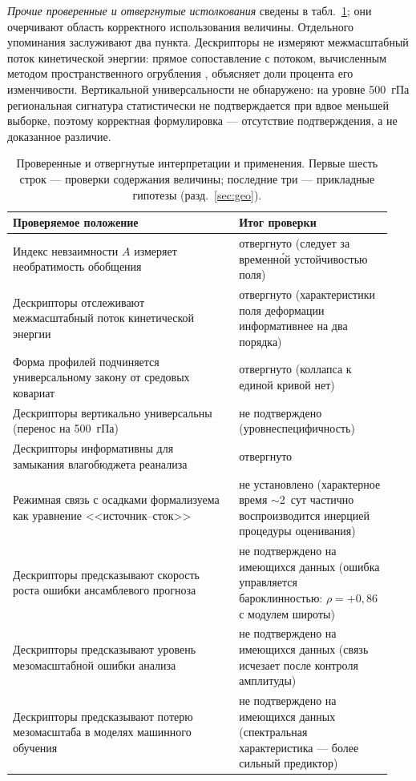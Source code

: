 \documentclass[11pt,a4paper]{article}
\begin{document}
\emph{Прочие проверенные и отвергнутые истолкования} сведены в табл.~\ref{tab:negative}; они очерчивают область корректного использования величины. Отдельного упоминания заслуживают два пункта. Дескрипторы не измеряют межмасштабный поток кинетической энергии: прямое сопоставление с потоком, вычисленным методом пространственного огрубления \cite{Germano1992,Aluie2018}, объясняет доли процента его изменчивости. Вертикальной универсальности не обнаружено: на уровне 500~гПа региональная сигнатура статистически не подтверждается при вдвое меньшей выборке, поэтому корректная формулировка --- отсутствие подтверждения, а не доказанное различие.

\begin{table}[H]
\centering
\caption{Проверенные и отвергнутые интерпретации и применения. Первые шесть строк --- проверки содержания величины; последние три --- прикладные гипотезы (разд.~\ref{sec:geo}).}
\label{tab:negative}
\small
\begin{tabular}{@{}p{0.56\linewidth}p{0.38\linewidth}@{}}
\toprule
Проверяемое положение & Итог проверки\\
\midrule
Индекс невзаимности $A$ измеряет необратимость обобщения & отвергнуто (следует за временн\'{о}й устойчивостью поля)\\
Дескрипторы отслеживают межмасштабный поток кинетической энергии \cite{Germano1992,Aluie2018} & отвергнуто (характеристики поля деформации информативнее на два порядка)\\
Форма профилей подчиняется универсальному закону от средовых ковариат & отвергнуто (коллапса к единой кривой нет)\\
Дескрипторы вертикально универсальны (перенос на 500~гПа) & не подтверждено (уровнеспецифичность)\\
Дескрипторы информативны для замыкания влагобюджета реанализа \cite{Trenberth1991,Mayer2021} & отвергнуто\\
Режимная связь с осадками формализуема как уравнение <<источник--сток>> \cite{Masunaga2012,PetersNeelin2006} & не установлено (характерное время $\sim$2~сут частично воспроизводится инерцией процедуры оценивания)\\
Дескрипторы предсказывают скорость роста ошибки ансамблевого прогноза & не подтверждено на имеющихся данных (ошибка управляется бароклинностью: $\rho=+0{,}86$ с модулем широты)\\
Дескрипторы предсказывают уровень мезомасштабной ошибки анализа & не подтверждено на имеющихся данных (связь исчезает после контроля амплитуды)\\
Дескрипторы предсказывают потерю мезомасштаба в моделях машинного обучения \cite{Lam2023,Bi2023,Price2025,Rasp2024} & не подтверждено на имеющихся данных (спектральная характеристика --- более сильный предиктор)\\
\bottomrule
\end{tabular}
\end{table}
\end{document}
